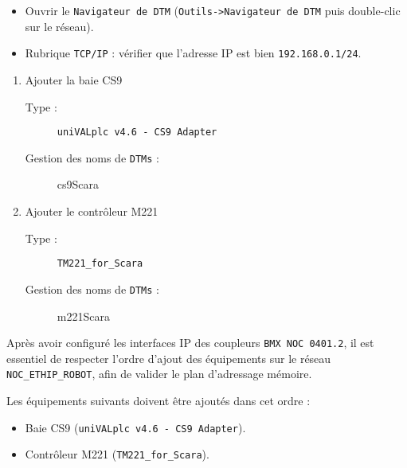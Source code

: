 \begin{UPSTIManipulation}
    \begin{itemize}
        \item Ouvrir le \texttt{Navigateur de DTM} (\texttt{Outils->Navigateur de DTM} puis double-clic sur le réseau).
        \item Rubrique \texttt{TCP/IP} : vérifier que l'adresse IP est bien \texttt{192.168.0.1/24}.
        \end{itemize}
    \begin{enumerate}
        \item Ajouter la baie CS9 
        \begin{description}
            \item [Type :] \texttt{uniVALplc v4.6 - CS9 Adapter}
            \item [Gestion des noms de \texttt{DTMs} :] cs9Scara
        \end{description}
        \item Ajouter le contrôleur M221
        \begin{description}
            \item [Type :] \texttt{TM221\_for\_Scara}
            \item [Gestion des noms de \texttt{DTMs} :] m221Scara
        \end{description}
    \end{enumerate}
\end{UPSTIManipulation}

\begin{UPSTIManipulation}
    
\end{UPSTIManipulation}

Après avoir configuré les interfaces IP des coupleurs \texttt{BMX NOC 0401.2}, il est essentiel de respecter l'ordre d'ajout des équipements sur le réseau \texttt{NOC\_ETHIP\_ROBOT}, afin de valider le plan d'adressage mémoire.

Les équipements suivants doivent être ajoutés dans cet ordre :
\begin{itemize}
    \item Baie CS9 (\texttt{uniVALplc v4.6 - CS9 Adapter}).
    \item Contrôleur M221 (\texttt{TM221\_for\_Scara}).
\end{itemize}

